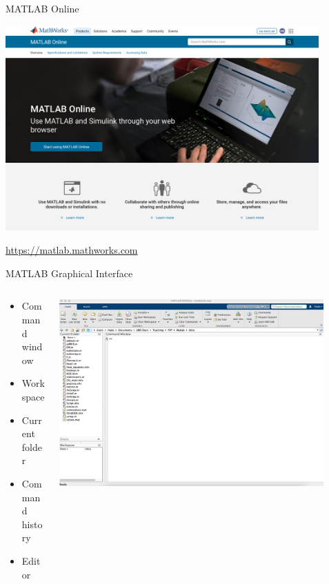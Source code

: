 \begin{frame}{MATLAB Online}
\begin{center}
	\includegraphics[width=0.9\textwidth]{matlab_online}
\end{center}
\url{https://matlab.mathworks.com}
\end{frame}



\begin{frame}{MATLAB Graphical Interface}
\begin{columns}
\begin{column}[T]{0.35\textwidth}
\begin{itemize}
	\item Command window
	\item Workspace
	\item Current folder
	\item Command history
	\item Editor
	\end{itemize}
\end{column}
\begin{column}[T]{0.75\textwidth}
	\includegraphics[width=0.9\textwidth]{initial_matlab}
\end{column}
\end{columns}




\end{frame}

